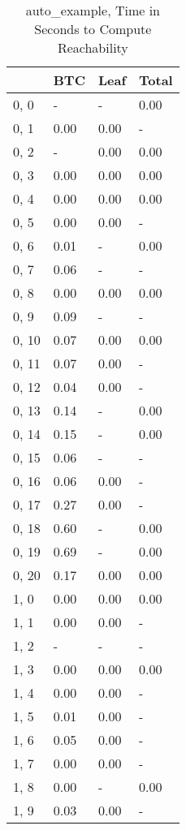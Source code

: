 \begin{table}
\centering
\caption{auto_example, Time in Seconds to Compute Reachability}
\label{auto_example_states_time}
\begin{tabular}{llll}
\toprule
{} &     BTC &  Leaf & Total \\
\midrule
0, 0   &       - &     - &  0.00 \\
0, 1   &    0.00 &  0.00 &     - \\
0, 2   &       - &  0.00 &  0.00 \\
0, 3   &    0.00 &  0.00 &  0.00 \\
0, 4   &    0.00 &  0.00 &  0.00 \\
0, 5   &    0.00 &  0.00 &     - \\
0, 6   &    0.01 &     - &  0.00 \\
0, 7   &    0.06 &     - &     - \\
0, 8   &    0.00 &  0.00 &  0.00 \\
0, 9   &    0.09 &     - &     - \\
0, 10  &    0.07 &  0.00 &  0.00 \\
0, 11  &    0.07 &  0.00 &     - \\
0, 12  &    0.04 &  0.00 &     - \\
0, 13  &    0.14 &     - &  0.00 \\
0, 14  &    0.15 &     - &  0.00 \\
0, 15  &    0.06 &     - &     - \\
0, 16  &    0.06 &  0.00 &     - \\
0, 17  &    0.27 &  0.00 &     - \\
0, 18  &    0.60 &     - &  0.00 \\
0, 19  &    0.69 &     - &  0.00 \\
0, 20  &    0.17 &  0.00 &  0.00 \\
1, 0   &    0.00 &  0.00 &  0.00 \\
1, 1   &    0.00 &  0.00 &     - \\
1, 2   &       - &     - &     - \\
1, 3   &    0.00 &  0.00 &  0.00 \\
1, 4   &    0.00 &  0.00 &     - \\
1, 5   &    0.01 &  0.00 &     - \\
1, 6   &    0.05 &  0.00 &     - \\
1, 7   &    0.00 &  0.00 &     - \\
1, 8   &    0.00 &     - &  0.00 \\
1, 9   &    0.03 &  0.00 &     - \\

\end{tabular}
\end{table}
